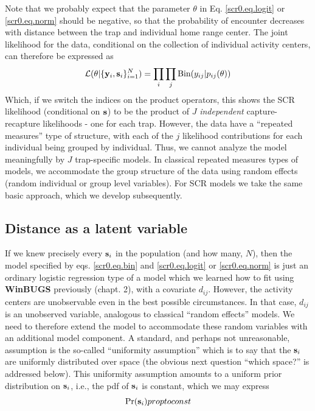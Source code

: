 Note that we probably expect that the parameter $\theta$ in
Eq. \ref{scr0.eq.logit} or \ref{scr0.eq.norm} should be negative, so
that the probability of encounter decreases with distance between the
trap and individual home range center.  The joint likelihood for the
data, conditional on the collection of individual activity centers,
can therefore be expressed as
\[
{\cal L}(\theta | \{ {\bf y}_{i},{\bf s}_{i} \}_{i=1}^{N})
 =  \prod_{i} \prod_{j} \mbox{Bin}(y_{ij}|p_{ij}(\theta))
\]
Which, if we switch the indices on the product operators, this shows
the SCR likelihood (conditional on ${\bf s}$) to be the product of $J$
{\it independent} capture-recapture likelihoods - one for each trap.
However, the data have a ``repeated measures'' type of structure, with
each of the $j$ likelihood contributions for each individual being
grouped by individual. Thus, we cannot analyze the model
meaningfully by $J$ trap-specific models. In classical repeated measures
types of models, we accommodate the group structure of the data using
random effects (random individual or group level variables). For SCR
models we take the same basic approach, which we develop subsequently.

\subsection{Distance as a latent variable}
	
If we knew precisely every ${\bf s}_{i}$ in the population (and how
many, $N$), then the model specified by eqs. \ref{scr0.eq.bin} and
\ref{scr0.eq.logit} or \ref{scr0.eq.norm} is just an ordinary logistic
regression type of a model which we learned how to fit using {\bf
  WinBUGS} previously (chapt. 2), with a covariate $d_{ij}$. However,
the activity centers are unobservable even in the best possible
circumstances. In that case, $d_{ij}$ is an unobserved variable,
analogous to classical ``random effects'' models. We need to therefore
extend the model to accommodate these random variables with an
additional model component. A standard, and perhaps not unreasonable,
assumption is the so-called ``uniformity assumption'' which is to say
that the ${\bf s}_{i}$ are uniformly distributed over space (the
obvious next question ``which space?'' is addressed below).  This
uniformity assumption amounts to a uniform prior distribution on ${\bf
  s}_{i}$, i.e., the pdf of ${\bf s}_{i}$ is constant, which we may
express
\begin{equation}
	\Pr({\bf s}_{i}) propto const	
\label{scr0.eq.sprior}
\end{equation}

